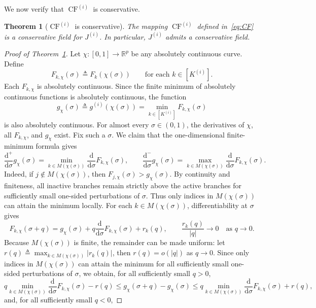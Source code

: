 \documentclass[11pt, letterpaper, oneside, reqno]{amsart}
\newcommand{\R}{\mathbb{R}}
\newcommand{\Let}{\triangleq}
\newcommand{\dd}{\mathrm{d}}
\newtheorem{theorem}{Theorem}
\begin{document}
We now verify that $\operatorname{CF}^{(i)}$ is conservative.

\begin{theorem}[$\operatorname{CF}^{(i)}$ is conservative]\label{thm:conservative-field}
The mapping $\operatorname{CF}^{(i)}$ defined in~\eqref{eq:CF} is a conservative field for $J^{(i)}$. In particular, $J^{(i)}$ admits a conservative field.
\end{theorem}

\begin{proof}[Proof of Theorem~\ref{thm:conservative-field}]
Let $\chi:[0,1]\to\R^p$ be any absolutely continuous curve. Define
\[
F_{k,\chi}(\sigma)\Let F_k(\chi(\sigma)) \qquad \text{for each } k\in[K^{(i)}].
\]
Each $F_{k,\chi}$ is absolutely continuous. Since the finite minimum of absolutely continuous functions is absolutely continuous, the function
\[
g_\chi(\sigma)\Let g^{(i)}(\chi(\sigma))
=\min_{k\in[K^{(i)}]}F_{k,\chi}(\sigma)
\]
is also absolutely continuous.
For almost every $\sigma\in(0,1)$, the derivatives of $\chi$, all $F_{k,\chi}$, and $g_\chi$ exist. Fix such a $\sigma$. We claim that the one-dimensional finite-minimum formula gives
\begin{equation}
\frac{\dd^+}{\dd\sigma}g_\chi(\sigma)
= \min_{k\in M(\chi(\sigma))} \frac{\dd}{\dd\sigma}F_{k,\chi}(\sigma),
\qquad
\frac{\dd^-}{\dd\sigma}g_\chi(\sigma)
= \max_{k\in M(\chi(\sigma))} \frac{\dd}{\dd\sigma}F_{k,\chi}(\sigma).
\label{eq:derivative-g-chi}
\end{equation}
Indeed, if $j\notin M(\chi(\sigma))$, then $F_{j,\chi}(\sigma)>g_\chi(\sigma)$.
By continuity and finiteness, all inactive branches remain strictly above the active branches for sufficiently small one-sided perturbations of $\sigma$. Thus only indices in $M(\chi(\sigma))$ can attain the minimum locally. For each $k\in M(\chi(\sigma))$, differentiability at $\sigma$ gives
\[
F_{k,\chi}(\sigma+q)
= g_\chi(\sigma) + q\frac{\dd}{\dd\sigma}F_{k,\chi}(\sigma) + r_k(q),
\qquad \frac{r_k(q)}{|q|}\to 0
\quad\text{as }q\to 0.
\]
Because $M(\chi(\sigma))$ is finite, the remainder can be made uniform: let $r(q)\Let \max_{k\in M(\chi(\sigma))}|r_k(q)|$, then $r(q)=o(|q|)$ as $q\to0$. Since only indices in $M(\chi(\sigma))$ can attain the minimum for all sufficiently small one-sided perturbations of $\sigma$, we obtain, for all sufficiently small $q>0$,
\[
q\min_{k\in M(\chi(\sigma))}\frac{\dd}{\dd\sigma}F_{k,\chi}(\sigma)-r(q)
\le g_\chi(\sigma+q)-g_\chi(\sigma)
\le q\min_{k\in M(\chi(\sigma))}\frac{\dd}{\dd\sigma}F_{k,\chi}(\sigma)+r(q),
\]
and, for all sufficiently small $q<0$,

\end{proof}
\end{document}
